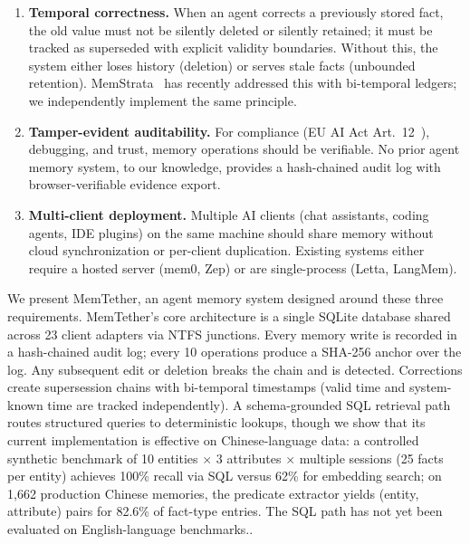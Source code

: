 ﻿\documentclass{article}
\begin{document}
\begin{enumerate}
\item \textbf{Temporal correctness.} When an agent corrects a previously stored fact, the old value must not be silently deleted or silently retained; it must be tracked as superseded with explicit validity boundaries. Without this, the system either loses history (deletion) or serves stale facts (unbounded retention). MemStrata~\citep{memstrata} has recently addressed this with bi-temporal ledgers; we independently implement the same principle.
\item \textbf{Tamper-evident auditability.} For compliance (EU AI Act Art.~12~\citep{euaiact}), debugging, and trust, memory operations should be verifiable. No prior agent memory system, to our knowledge, provides a hash-chained audit log with browser-verifiable evidence export.
\item \textbf{Multi-client deployment.} Multiple AI clients (chat assistants, coding agents, IDE plugins) on the same machine should share memory without cloud synchronization or per-client duplication. Existing systems either require a hosted server (mem0, Zep) or are single-process (Letta, LangMem).
\end{enumerate}

We present MemTether, an agent memory system designed around these three requirements. MemTether's core architecture is a single SQLite database shared across 23 client adapters via NTFS junctions. Every memory write is recorded in a hash-chained audit log; every 10 operations produce a SHA-256 anchor over the log. Any subsequent edit or deletion breaks the chain and is detected. Corrections create supersession chains with bi-temporal timestamps (valid time and system-known time are tracked independently). A schema-grounded SQL retrieval path routes structured queries to deterministic lookups, though we show that its current implementation is effective on Chinese-language data: a controlled synthetic benchmark of 10 entities $\times$ 3 attributes $\times$ multiple sessions (25 facts per entity) achieves 100\% recall via SQL versus 62\% for embedding search; on 1{,}662 production Chinese memories, the predicate extractor yields (entity, attribute) pairs for 82.6\% of fact-type entries. The SQL path has not yet been evaluated on English-language benchmarks..
\end{document}
